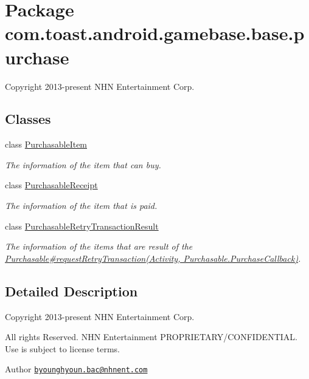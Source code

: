 \hypertarget{namespacecom_1_1toast_1_1android_1_1gamebase_1_1base_1_1purchase}{}\section{Package com.\+toast.\+android.\+gamebase.\+base.\+purchase}
\label{namespacecom_1_1toast_1_1android_1_1gamebase_1_1base_1_1purchase}


Copyright 2013-\/present N\+HN Entertainment Corp.  


\subsection*{Classes}
\begin{DoxyCompactItemize}
\item 
class \hyperlink{classcom_1_1toast_1_1android_1_1gamebase_1_1base_1_1purchase_1_1_purchasable_item}{Purchasable\+Item}
\begin{DoxyCompactList}\small\item\em The information of the item that can buy. \end{DoxyCompactList}\item 
class \hyperlink{classcom_1_1toast_1_1android_1_1gamebase_1_1base_1_1purchase_1_1_purchasable_receipt}{Purchasable\+Receipt}
\begin{DoxyCompactList}\small\item\em The information of the item that is paid. \end{DoxyCompactList}\item 
class \hyperlink{classcom_1_1toast_1_1android_1_1gamebase_1_1base_1_1purchase_1_1_purchasable_retry_transaction_result}{Purchasable\+Retry\+Transaction\+Result}
\begin{DoxyCompactList}\small\item\em The information of the items that are result of the \hyperlink{}{Purchasable\#request\+Retry\+Transaction(\+Activity, Purchasable.\+Purchase\+Callback)}. \end{DoxyCompactList}\end{DoxyCompactItemize}


\subsection{Detailed Description}
Copyright 2013-\/present N\+HN Entertainment Corp. 

All rights Reserved. N\+HN Entertainment P\+R\+O\+P\+R\+I\+E\+T\+A\+R\+Y/\+C\+O\+N\+F\+I\+D\+E\+N\+T\+I\+AL. Use is subject to license terms.

\begin{DoxyAuthor}{Author}
\href{mailto:byounghyoun.bac@nhnent.com}{\tt byounghyoun.\+bac@nhnent.\+com} 
\end{DoxyAuthor}
